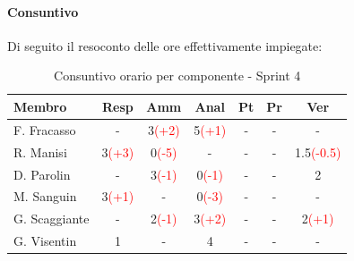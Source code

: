 \documentclass[a4paper,12pt]{article}
\begin{document}
\paragraph{Consuntivo}
Di seguito il resoconto delle ore effettivamente impiegate:

\begin{table}[H]
    \centering
    \renewcommand{\arraystretch}{1.3}
    \small
    \begin{tabularx}{\textwidth}{|l|C|C|C|C|C|C|}
        \hline
        \textbf{Membro} & \textbf{Resp} & \textbf{Amm} & \textbf{Anal} & \textbf{Pt} & \textbf{Pr} & \textbf{Ver} \\
        \hline
        F. Fracasso & - & 3\textcolor{red}{(+2)} & 5\textcolor{red}{(+1)} & - & - & - \\
        \hline
        R. Manisi & 3\textcolor{red}{(+3)} & 0\textcolor{red}{(-5)} & - & - & - & 1.5\textcolor{red}{(-0.5)} \\
        \hline
        D. Parolin & - & 3\textcolor{red}{(-1)} & 0\textcolor{red}{(-1)} & - & - & 2 \\
        \hline
        M. Sanguin & 3\textcolor{red}{(+1)} & - & 0\textcolor{red}{(-3)} & - & - & - \\
        \hline
        G. Scaggiante & - & 2\textcolor{red}{(-1)} & 3\textcolor{red}{(+2)} & - & - & 2\textcolor{red}{(+1)} \\
        \hline
        G. Visentin & 1 & - & 4 & - & - & - \\
        \hline
    \end{tabularx}
    \caption{Consuntivo orario per componente - Sprint 4}
    \label{tab:consuntivo_sprint4}
\end{table}
\end{document}
